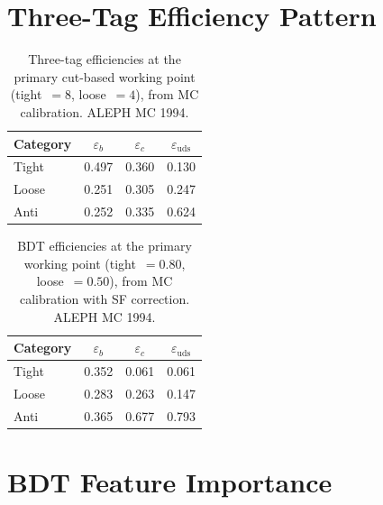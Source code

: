 \documentclass[11pt,a4paper]{article}
\begin{document}
\clearpage


\clearpage
\appendix

\section{Three-Tag Efficiency Pattern}
\label{app:efficiencies}

\begin{table}[htbp]
\centering
\caption{Three-tag efficiencies at the primary cut-based working point
  (tight~$=8$, loose~$=4$), from MC calibration.  ALEPH MC 1994.}
\label{tbl:efficiencies}
\begin{tabular}{lccc}
\toprule
Category & $\varepsilon_b$ & $\varepsilon_c$ & $\varepsilon_\mathrm{uds}$ \\
\midrule
Tight  & 0.497 & 0.360 & 0.130 \\
Loose  & 0.251 & 0.305 & 0.247 \\
Anti   & 0.252 & 0.335 & 0.624 \\
\bottomrule
\end{tabular}
\end{table}

\begin{table}[htbp]
\centering
\caption{BDT efficiencies at the primary working point
  (tight~$=0.80$, loose~$=0.50$), from MC calibration with SF correction.
  ALEPH MC 1994.}
\label{tbl:bdt-efficiencies}
\begin{tabular}{lccc}
\toprule
Category & $\varepsilon_b$ & $\varepsilon_c$ & $\varepsilon_\mathrm{uds}$ \\
\midrule
Tight  & 0.352 & 0.061 & 0.061 \\
Loose  & 0.283 & 0.263 & 0.147 \\
Anti   & 0.365 & 0.677 & 0.793 \\
\bottomrule
\end{tabular}
\end{table}

\section{BDT Feature Importance}
\label{app:bdt-features}
\end{document}
